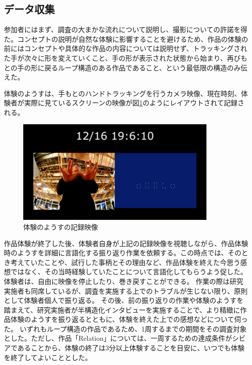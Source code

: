 \subsection{データ収集}
参加者にはまず、調査の大まかな流れについて説明し、撮影についての許諾を得た。コンセプトの説明が自然な体験に影響することを避けるため、作品の体験の前にはコンセプトや具体的な作品の内容については説明せず、トラッキングされた手が次々に形を変えていくこと、手の形が表示された状態から始まり、再びもとの手の形に戻るループ構造のある作品であること、という最低限の構造のみ伝えた。

体験のようすは、手もとのハンドトラッキングを行うカメラ映像、現在時刻、体験者が実際に見ているスクリーンの映像が図\ref{fig:record_monitor}のようにレイアウトされて記録される。

\begin{figure}[H]
  \centering
  \includegraphics[width=10cm]{img/record_monitor.jpg}
  \caption{体験のようすの記録映像}
  \label{fig:record_monitor}
\end{figure}

作品体験が終了した後、体験者自身が上記の記録映像を視聴しながら、作品体験時のようすを詳細に言語化する振り返り作業を依頼する。この時点では、そのとき考えていたことや、試行した事柄とその理由など、作品体験を終えた今思う感想ではなく、その当時経験していたことについて言語化してもらうよう促した。体験者は、自由に映像を停止したり、巻き戻すことができる。
作業の際は研究実施者も同席しているが、調査を実施する上でのトラブルが生じない限り、原則として体験者個人で振り返る。
その後、前の振り返りの作業や体験のようすを踏まえて、研究実施者が半構造化インタビューを実施することで、より精緻に作品体験のようすを振り返るとともに、体験を終えた上での感想などについて伺った。
いずれもループ構造の作品であるため、1周するまでの期間をその調査対象とした。ただし、作品「Relation」については、一周するための達成条件がシビアであることから、体験の終了は3分以上体験することを目安に、いつでも体験を終了してよいこととした。

